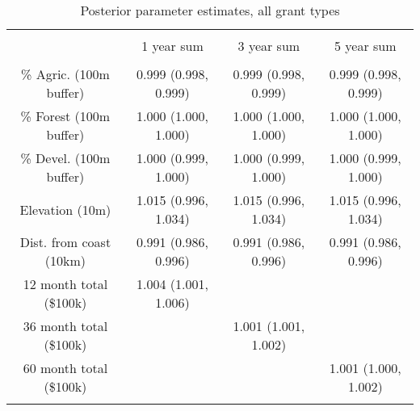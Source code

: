 
\begin{table}[!htbp] \centering 
  \caption{Posterior parameter estimates, all grant types} 
  \label{table:basecoefs} 
\begin{tabular}{@{\extracolsep{5pt}} cccc} 
\\[-1.8ex]\hline 
\hline \\[-1.8ex] 
 & 1 year sum & 3 year sum & 5 year sum \\ 
\hline \\[-1.8ex] 
\% Agric. (100m buffer) & 0.999 (0.998, 0.999) & 0.999 (0.998, 0.999) & 0.999 (0.998, 0.999) \\ 
\% Forest (100m buffer) & 1.000 (1.000, 1.000) & 1.000 (1.000, 1.000) & 1.000 (1.000, 1.000) \\ 
\% Devel. (100m buffer) & 1.000 (0.999, 1.000) & 1.000 (0.999, 1.000) & 1.000 (0.999, 1.000) \\ 
Elevation (10m) & 1.015 (0.996, 1.034) & 1.015 (0.996, 1.034) & 1.015 (0.996, 1.034) \\ 
Dist. from coast (10km) & 0.991 (0.986, 0.996) & 0.991 (0.986, 0.996) & 0.991 (0.986, 0.996) \\ 
12 month total (\$100k) & 1.004 (1.001, 1.006) &  &  \\ 
36 month total (\$100k) &  & 1.001 (1.001, 1.002) &  \\ 
60 month total (\$100k) &  &  & 1.001 (1.000, 1.002) \\ 
\hline \\[-1.8ex] 
\end{tabular} 
\end{table} 
